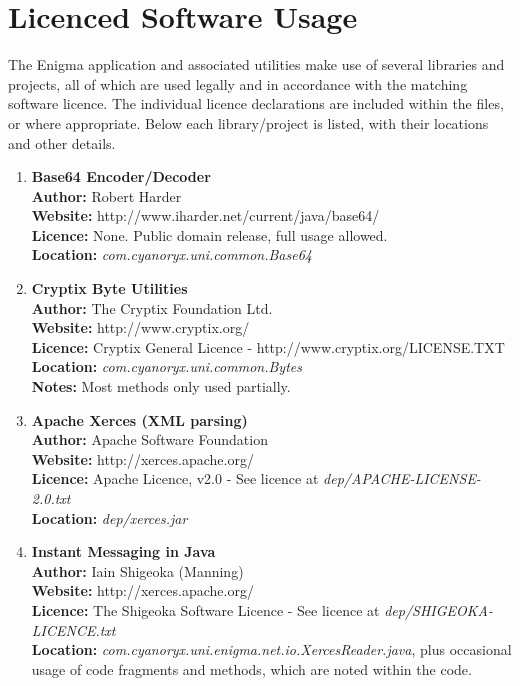 
\chapter{Licenced Software Usage}
\label{AppendixC}

The Enigma application and associated utilities make use of several libraries and projects, all of which are used legally and in accordance with the matching software licence. The individual licence declarations are included within the files, or where appropriate. Below each library/project is listed, with their locations and other details.

\begin{enumerate}
	\item \textbf{Base64 Encoder/Decoder} \\
		\textbf{Author:} Robert Harder \\
		\textbf{Website:} http://www.iharder.net/current/java/base64/ \\
		\textbf{Licence:} None. Public domain release, full usage allowed. \\
		\textbf{Location:} \emph{com.cyanoryx.uni.common.Base64}
		
	\item \textbf{Cryptix Byte Utilities} \\
		\textbf{Author:} The Cryptix Foundation Ltd. \\
		\textbf{Website:} http://www.cryptix.org/ \\
		\textbf{Licence:} Cryptix General Licence -  http://www.cryptix.org/LICENSE.TXT \\
		\textbf{Location:} \emph{com.cyanoryx.uni.common.Bytes} \\
		\textbf{Notes:} Most methods only used partially.
		
	\item \textbf{Apache Xerces (XML parsing)} \\
		\textbf{Author:} Apache Software Foundation \\
		\textbf{Website:} http://xerces.apache.org/ \\
		\textbf{Licence:} Apache Licence, v2.0 - See licence at \emph{dep/APACHE-LICENSE-2.0.txt} \\
		\textbf{Location:} \emph{dep/xerces.jar}
		
	\item \textbf{Instant Messaging in Java} \\
		\textbf{Author:}  Iain Shigeoka (Manning) \\
		\textbf{Website:} http://xerces.apache.org/ \\
		\textbf{Licence:} The Shigeoka Software Licence - See licence at \emph{dep/SHIGEOKA-LICENCE.txt} \\
		\textbf{Location:} \emph{com.cyanoryx.uni.enigma.net.io.XercesReader.java}, plus occasional usage of code fragments and methods, which are noted within the code.
\end{enumerate}